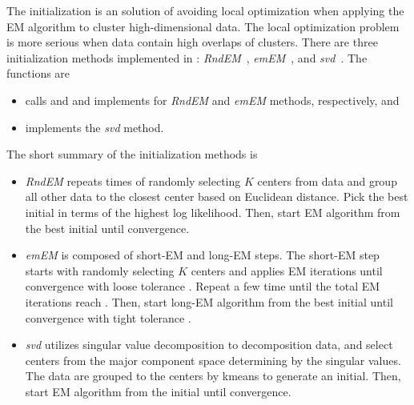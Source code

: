 The initialization is an solution of avoiding local optimization
when applying the EM algorithm to cluster high-dimensional data.
The local optimization problem is more serious when data contain high
overlaps of clusters. There are three initialization methods
implemented in :
{\it RndEM}~\citep{maitra09},
{\it emEM}~\citep{biernackietal03}, and
{\it svd}~\citep{maitra01}.
The  functions are
\begin{itemize}
\item
   calls  and
   and implements for {\it RndEM} and {\it emEM} methods,
  respectively, and
\item
   implements the {\it svd} method.
\end{itemize}
The short summary of the initialization methods is
\begin{itemize}
\item {\it RndEM} repeats  times of randomly selecting
$K$ centers from data and group all other data to the closest center
based on Euclidean distance. Pick the best initial
in terms of the highest log likelihood. Then, start EM algorithm from
the best initial until convergence.

\item {\it emEM} is composed of short-EM and long-EM steps.
The short-EM step starts with randomly selecting $K$ centers and applies
EM iterations until convergence with loose tolerance .
Repeat a few time until the total
EM iterations reach . Then, start long-EM algorithm from
the best initial until convergence with tight tolerance .

\item {\it svd} utilizes singular value decomposition to decomposition
data, and select centers from the major component space determining by
the singular values. The data are grouped to the centers by kmeans
to generate an initial. Then, start EM algorithm from the initial
until convergence.

\end{itemize}


